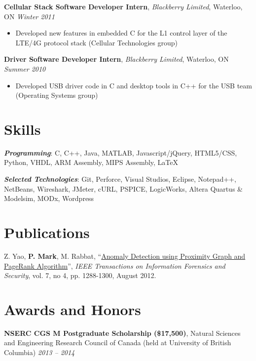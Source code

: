 \documentclass[letterpaper]{article}
\newcommand{\jobtitle}[4]{
  \textbf{#1}, \emph{#2}, {#3} \hfill \emph{#4}\\
}
\newenvironment{jobdescription}{
  \vspace{-4pt}
  \begin{itemize}
  \setlength{\itemsep}{2pt}
  \setlength{\parskip}{0pt}
  \setlength{\parsep}{0pt}
}{\end{itemize}}
\newcommand{\itemdescription}[3]{
  \textbf{#1}, {#2} \hfill \emph{#3}\\
  \medskip
}
\begin{document}
\jobtitle{Cellular Stack Software Developer Intern}{Blackberry
Limited}{Waterloo, ON}{Winter 2011}
\begin{jobdescription}
  \item Developed new features in embedded C for the L1 control layer of the
  LTE/4G protocol stack (Cellular Technologies group)
\end{jobdescription}

\jobtitle{Driver Software Developer Intern}{Blackberry
Limited}{Waterloo, ON}{Summer 2010} 
\begin{jobdescription}
  \item Developed USB driver code in C and desktop tools in C++ for the USB
  team (Operating Systems group)
\end{jobdescription}
\medskip

\section*{Skills}
\emph{\textbf{Programming}}: C, C++, Java, MATLAB, Javascript/jQuery,
HTML5/CSS, Python, VHDL, ARM Assembly, MIPS Assembly, \LaTeX\\
\medskip

\emph{\textbf{Selected Technologies}}: Git, Perforce, Visual Studios, Eclipse,
Notepad++, NetBeans, Wireshark, JMeter, cURL, PSPICE, LogicWorks, Altera
Quartus \& Modelsim, MODx, Wordpress\\
\bigskip

\hypertarget{sec:publications}{}
\section*{Publications}
Z. Yao, \textbf{P. Mark}, M. Rabbat, 
``\href{http://ieeexplore.ieee.org/xpl/articleDetails.jsp?arnumber=6175122}
{Anomaly Detection using Proximity Graph and PageRank Algorithm}'', \emph{IEEE 
Transactions on Information Forensics and Security}, vol. 7, no 4, pp. 
1288-1300, August 2012.
\bigskip

\section*{Awards and Honors}
\itemdescription{NSERC CGS M Postgraduate Scholarship (\$17,500)}{Natural 
Sciences and Engineering Research Council of Canada (held at University of
British Columbia)}{2013 -- 2014}
\end{document}
